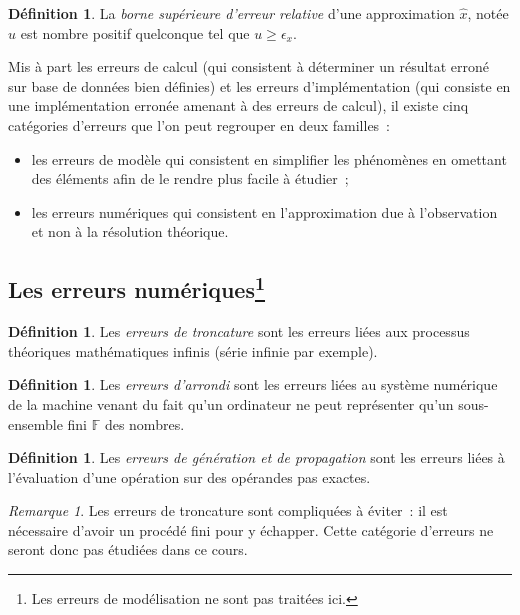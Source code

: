 \documentclass{article}
\theoremstyle{definition}
\newtheorem{déf}[thm]{Définition}
\theoremstyle{remark}
\newtheorem*{rmq}{Remarque}
\newcommand{\F}{\mathbb F}
\begin{document}
		\begin{déf} La \emph{borne supérieure d'erreur relative} d'une approximation $\widehat x$, notée $u$ est nombre positif quelconque tel que
		$u \geq \epsilon_x$.
		\end{déf}

		Mis à part les erreurs de calcul (qui consistent à déterminer un résultat erroné sur base de données bien définies) et les erreurs d'implémentation
		(qui consiste en une implémentation erronée amenant à des erreurs de calcul), il existe cinq catégories d'erreurs que l'on peut regrouper en deux
		familles~:

		\begin{itemize}
			\item les erreurs de modèle qui consistent en simplifier les phénomènes en omettant des éléments afin de le rendre plus facile à étudier~;
			\item les erreurs numériques qui consistent en l'approximation due à l'observation et non à la résolution théorique.
		\end{itemize}

	\subsection[les erreurs numériques]{Les erreurs numériques\footnote{Les erreurs de modélisation ne sont pas traitées ici.}}
		\begin{déf} Les \emph{erreurs de troncature} sont les erreurs liées aux processus théoriques mathématiques infinis (série infinie par exemple).
		\end{déf}

		\begin{déf} Les \emph{erreurs d'arrondi} sont les erreurs liées au système numérique de la machine venant du fait qu'un ordinateur ne peut représenter
		qu'un sous-ensemble fini $\F$ des nombres.
		\end{déf}

		\begin{déf} Les \emph{erreurs de génération et de propagation} sont les erreurs liées à l'évaluation d'une opération sur des opérandes pas exactes.
		\end{déf}

		\begin{rmq} Les erreurs de troncature sont compliquées à éviter~: il est nécessaire d'avoir un procédé fini pour y échapper. Cette catégorie d'erreurs
		ne seront donc pas étudiées dans ce cours.
		\end{rmq}
\end{document}

